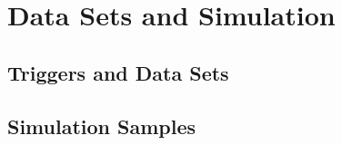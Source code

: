 \section{Data Sets and Simulation}\label{sec:datasets}

\subsection{Triggers and Data Sets}\label{subsec:triggers}

\subsection{Simulation Samples}\label{subsec:sim_samples}